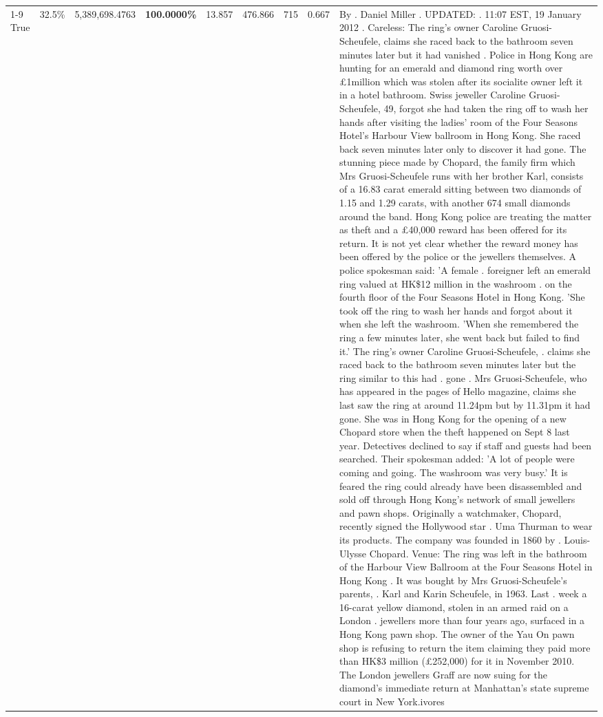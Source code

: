 \begin{table}[H]
\begin{tabular}{lllrlllll}
\cline{1-9}
True & 32.5\% & 5,389,698.4763 & \bfseries \color{red} 100.0000\% & 13.857 & 476.866 & 715 & 0.667 & By . Daniel Miller . UPDATED: . 11:07 EST, 19 January 2012 . Careless: The ring's owner Caroline Gruosi-Scheufele, claims she raced back to the bathroom seven minutes later but it had vanished . Police in Hong Kong are hunting for an emerald and diamond ring worth over £1million which was stolen after its socialite owner left it in a hotel bathroom. Swiss jeweller Caroline Gruosi-Scheufele, 49, forgot she had taken the ring off to wash her hands after visiting the ladies' room of the Four Seasons Hotel's Harbour View ballroom in Hong Kong. She raced back seven minutes later only to discover it had gone. The stunning piece made by Chopard, the family firm which Mrs Gruosi-Scheufele runs with her brother Karl, consists of a 16.83 carat emerald sitting between two diamonds of 1.15 and 1.29 carats, with another 674 small diamonds around the band. Hong Kong police are treating the matter as theft and a £40,000 reward has been offered for its return. It is not yet clear whether the reward money has been offered by the police or the jewellers themselves. A police spokesman said: 'A female . foreigner left an emerald ring valued at HK\$12 million in the washroom . on the fourth floor of the Four Seasons Hotel in Hong Kong. 'She took off the ring to wash her hands and forgot about it when she left the washroom. 'When she remembered the ring a few minutes later, she went back but failed to find it.' The ring's owner Caroline Gruosi-Scheufele, . claims she raced back to the bathroom seven minutes later but the ring similar to this had . gone . Mrs Gruosi-Scheufele, who has appeared in the pages of Hello magazine, claims she last saw the ring at around 11.24pm but by 11.31pm it had gone. She was in Hong Kong for the opening of a new Chopard store when the theft happened on Sept 8 last year. Detectives declined to say if staff and guests had been searched. Their spokesman added: 'A lot of people were coming and going. The washroom was very busy.' It is feared the ring could already have been disassembled and sold off through Hong Kong's network of small jewellers and pawn shops. Originally a watchmaker, Chopard, recently signed the Hollywood star . Uma Thurman to wear its products. The company was founded in 1860 by . Louis-Ulysse Chopard. Venue: The ring was left in the bathroom of the Harbour View Ballroom at the Four Seasons Hotel in Hong Kong . It was bought by Mrs Gruosi-Scheufele's  parents, . Karl and Karin Scheufele, in 1963. Last . week a 16-carat yellow diamond, stolen in an armed raid on a London . jewellers more than four years ago, surfaced in a Hong Kong pawn shop. The owner of the Yau On pawn shop is refusing to return the item claiming they paid more than HK\$3 million (£252,000) for it in November 2010. The London jewellers Graff are now suing for the diamond’s immediate return at Manhattan’s state supreme court in New York.ivores \\

\end{tabular}
\end{table}

